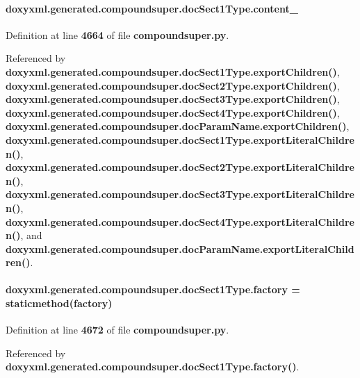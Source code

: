 \paragraph[{content\+\_\+}]{\setlength{\rightskip}{0pt plus 5cm}doxyxml.\+generated.\+compoundsuper.\+doc\+Sect1\+Type.\+content\+\_\+}\label{classdoxyxml_1_1generated_1_1compoundsuper_1_1docSect1Type_a78a74e53183880ed49daa052197529fa}


Definition at line {\bf 4664} of file {\bf compoundsuper.\+py}.



Referenced by {\bf doxyxml.\+generated.\+compoundsuper.\+doc\+Sect1\+Type.\+export\+Children()}, {\bf doxyxml.\+generated.\+compoundsuper.\+doc\+Sect2\+Type.\+export\+Children()}, {\bf doxyxml.\+generated.\+compoundsuper.\+doc\+Sect3\+Type.\+export\+Children()}, {\bf doxyxml.\+generated.\+compoundsuper.\+doc\+Sect4\+Type.\+export\+Children()}, {\bf doxyxml.\+generated.\+compoundsuper.\+doc\+Param\+Name.\+export\+Children()}, {\bf doxyxml.\+generated.\+compoundsuper.\+doc\+Sect1\+Type.\+export\+Literal\+Children()}, {\bf doxyxml.\+generated.\+compoundsuper.\+doc\+Sect2\+Type.\+export\+Literal\+Children()}, {\bf doxyxml.\+generated.\+compoundsuper.\+doc\+Sect3\+Type.\+export\+Literal\+Children()}, {\bf doxyxml.\+generated.\+compoundsuper.\+doc\+Sect4\+Type.\+export\+Literal\+Children()}, and {\bf doxyxml.\+generated.\+compoundsuper.\+doc\+Param\+Name.\+export\+Literal\+Children()}.

\paragraph[{factory}]{\setlength{\rightskip}{0pt plus 5cm}doxyxml.\+generated.\+compoundsuper.\+doc\+Sect1\+Type.\+factory = staticmethod(factory)\hspace{0.3cm}{\ttfamily [static]}}\label{classdoxyxml_1_1generated_1_1compoundsuper_1_1docSect1Type_a7ff44523bb82a83660acf47a8ae219f9}


Definition at line {\bf 4672} of file {\bf compoundsuper.\+py}.



Referenced by {\bf doxyxml.\+generated.\+compoundsuper.\+doc\+Sect1\+Type.\+factory()}.

